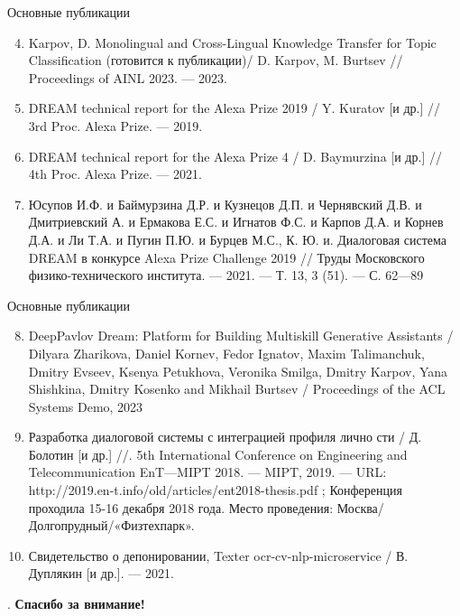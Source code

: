 \begin{frame}{Основные публикации}
\begin{enumerate}
\setcounter{enumi}{3}
\item Karpov, D. Monolingual and Cross-Lingual Knowledge Transfer for
Topic Classification (готовится к публикации)/ D. Karpov,
M. Burtsev // Proceedings of AINL 2023. — 2023.
\item DREAM technical report for the Alexa Prize 2019 / Y. Kuratov
[и др.] // 3rd Proc. Alexa Prize. — 2019.
\item DREAM technical report for the Alexa Prize 4  / D. Baymurzina
[и др.] // 4th Proc. Alexa Prize. — 2021.
\item Юсупов И.Ф. и Баймурзина Д.Р. и Кузнецов Д.П. и Чернявский Д.В. и Дмитриевский А. и Ермакова Е.С. и Игнатов Ф.С. и Карпов Д.А. и Корнев Д.А. и Ли Т.А. и Пугин П.Ю. и Бурцев М.С., К. Ю. и. Диалоговая система DREAM в конкурсе Alexa
Prize Challenge 2019 // Труды Московского физико-технического
института. — 2021. — Т. 13, 3 (51). — С. 62—89
\end{enumerate}
\end{frame}
\begin{frame}{Основные публикации}
\begin{enumerate}
\setcounter{enumi}{7}
\item DeepPavlov Dream: Platform for Building Multiskill Generative Assistants / Dilyara Zharikova, Daniel Kornev, Fedor Ignatov, Maxim Talimanchuk, Dmitry Evseev, Ksenya Petukhova, Veronika Smilga, Dmitry Karpov, Yana Shishkina, Dmitry Kosenko and Mikhail Burtsev / Proceedings of the ACL Systems Demo, 2023
\item Разработка диалоговой системы с интеграцией профиля лично­
сти  / Д. Болотин [и др.] //. 5th International Conference
on Engineering and Telecommunication EnT—MIPT 2018. — MIPT,
2019. — URL: http://2019.en-t.info/old/articles/ent2018-thesis.pdf ;
Конференция проходила 15-16 декабря 2018 года. Место проведения:
Москва/Долгопрудный/«Физтехпарк».
\item Свидетельство о депонировании, Texter ocr-cv-nlp-microservice / В. Дуплякин [и др.]. — 2021.
\end{enumerate}    
\end{frame}

\begin{frame}{.}
\centering
\Large \textbf{Спасибо за внимание!}
\end{frame}

